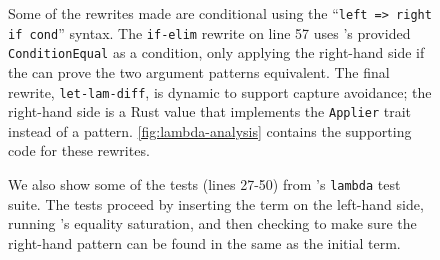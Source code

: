 \begin{figure}
{Some of the rewrites made are conditional using the
  ``\texttt{left => right if cond}''
  syntax.
The \texttt{if-elim} rewrite on line 57 uses \egg's provided
  \texttt{ConditionEqual} as a condition, only applying the right-hand side
  if the \egraph can prove the two argument patterns equivalent.
The final rewrite, \texttt{let-lam-diff}, is dynamic to support capture avoidance;
  the right-hand side is a Rust value that
  implements the \texttt{Applier} trait instead of a pattern.
\autoref{fig:lambda-analysis} contains the supporting code for these rewrites.

We also show some of the tests (lines 27-50)
  from \egg's \texttt{lambda} test suite.
The tests proceed by inserting the term on the left-hand side, running
  \egg's equality saturation, and then checking to make sure the right-hand
  pattern can be found in the same \eclass as the initial term.
}
\label{fig:lambda-rules}
\label{fig:lambda-lang}
\label{fig:lambda-examples}
\end{figure}

